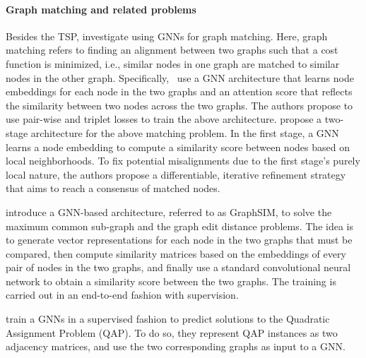 \documentclass[twoside,11pt]{article}
\begin{document}
\paragraph{Graph matching and related problems}
Besides the TSP, \cite{Fey+2020,Yuj+2019} investigate using GNNs for graph matching. Here, graph matching refers to finding an alignment between two graphs such that a cost function is minimized, i.e., similar nodes in one graph are matched to similar nodes in the other graph. Specifically,~\citet{Yuj+2019} use a GNN architecture that learns node embeddings for each node in the two graphs and an attention score that reflects the similarity between two nodes across the two graphs. The authors propose to use pair-wise and triplet losses to train the above architecture. \citet{Fey+2020} propose a two-stage architecture for the above matching problem. In the first stage, a GNN learns a node embedding to compute a similarity score between nodes based on local neighborhoods. To fix potential misalignments due to the first stage's purely local nature, the authors propose a differentiable, iterative refinement strategy that aims to reach a consensus of matched nodes.

\citet{bai2020learning} introduce a GNN-based architecture, referred to as GraphSIM, to solve the maximum common sub-graph and the graph edit distance problems. The idea is to generate vector representations for each node in the two graphs that must be compared, then compute similarity  matrices based on the embeddings of every pair of nodes in the two graphs, and finally use a standard convolutional neural network to  obtain a similarity score between the two graphs. The training is carried out in an end-to-end fashion with supervision. 

\citet{nowak2018revised} train a GNNs in a supervised fashion to predict solutions to the Quadratic Assignment Problem (QAP). To do so, they represent QAP instances as two adjacency matrices, and use the two corresponding graphs as input to a GNN.
\end{document}
